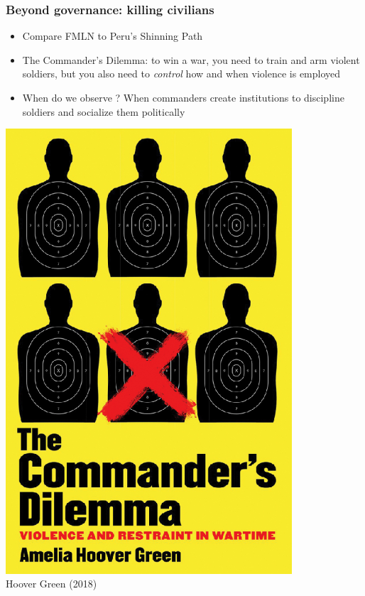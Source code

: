 \documentclass[aspectratio=43]{beamer}
\begin{document}
\begin{frame}
\frametitle{Beyond governance: killing civilians}
\centering

\begin{minipage}{.64\textwidth}\centering
\begin{itemize}
  \item<1-> Compare FMLN to Peru's Shinning Path
  \item<2-> The Commander's Dilemma: to win a war, you need to train and arm violent soldiers, but you also need to \textit{control} how and when violence is employed
  \item<2-> When do we observe ? When commanders create institutions to discipline soldiers and socialize them politically
\end{itemize}
\end{minipage}\hfill
\begin{minipage}{.34\textwidth}\centering
\includegraphics[width = 0.8\textwidth]{img/hoover_green}\\Hoover Green (2018)
\end{minipage}

\end{frame}
\end{document}
